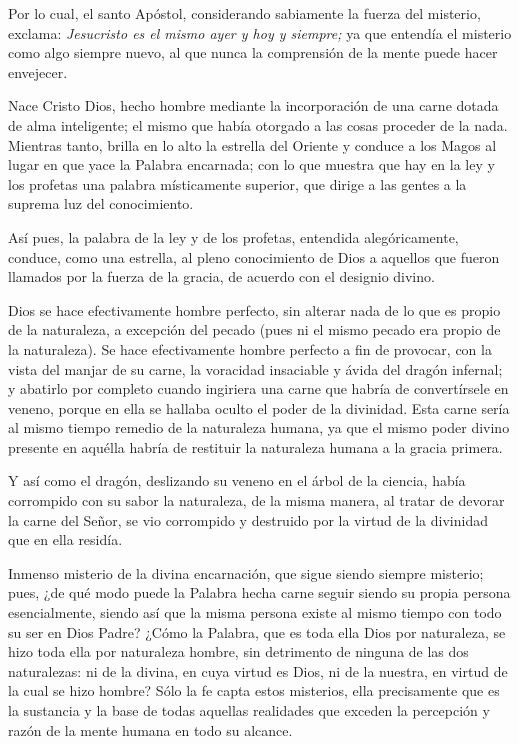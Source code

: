 \begin{body}
\begin{body}
Por lo cual, el santo Apóstol, considerando sabiamente la fuerza del misterio, exclama: \emph{Jesucristo es el mismo ayer y hoy y siempre;} ya que entendía el misterio como algo siempre nuevo, al que nunca la comprensión de la mente puede hacer envejecer.

Nace Cristo Dios, hecho hombre mediante la incorporación de una carne dotada de alma inteligente; el mismo que había otorgado a las cosas proceder de la nada. Mientras tanto, brilla en lo alto la estrella del Oriente y conduce a los Magos al lugar en que yace la Palabra encarnada; con lo que muestra que hay en la ley y los profetas una palabra místicamente superior, que dirige a las gentes a la suprema luz del conocimiento.

Así pues, la palabra de la ley y de los profetas, entendida alegóricamente, conduce, como una estrella, al pleno conocimiento de Dios a aquellos que fueron llamados por la fuerza de la gracia, de acuerdo con el designio divino.

Dios se hace efectivamente hombre perfecto, sin alterar nada de lo que es propio de la naturaleza, a excepción del pecado (pues ni el mismo pecado era propio de la naturaleza). Se hace efectivamente hombre perfecto a fin de provocar, con la vista del manjar de su carne, la voracidad insaciable y ávida del dragón infernal; y abatirlo por completo cuando ingiriera una carne que habría de convertírsele en veneno, porque en ella se hallaba oculto el poder de la divinidad. Esta carne sería al mismo tiempo remedio de la naturaleza humana, ya que el mismo poder divino presente en aquélla habría de restituir la naturaleza humana a la gracia primera.

Y así como el dragón, deslizando su veneno en el árbol de la ciencia, había corrompido con su sabor la naturaleza, de la misma manera, al tratar de devorar la carne del Señor, se vio corrompido y destruido por la virtud de la divinidad que en ella residía.

Inmenso misterio de la divina encarnación, que sigue siendo siempre misterio; pues, ¿de qué modo puede la Palabra hecha carne seguir siendo su propia persona esencialmente, siendo así que la misma persona existe al mismo tiempo con todo su ser en Dios Padre? ¿Cómo la Palabra, que es toda ella Dios por naturaleza, se hizo toda ella por naturaleza hombre, sin detrimento de ninguna de las dos naturalezas: ni de la divina, en cuya virtud es Dios, ni de la nuestra, en virtud de la cual se hizo hombre? Sólo la fe capta estos misterios, ella precisamente que es la sustancia y la base de todas aquellas realidades que exceden la percepción y razón de la mente humana en todo su alcance.



\end{body}
\end{body}
